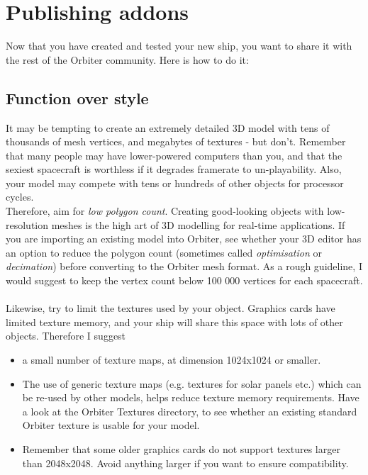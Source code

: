 \documentclass[Orbiter Developer Manual.tex]{subfiles}
\begin{document}
\section{Publishing addons}
Now that you have created and tested your new ship, you want to share it with the rest of the Orbiter community. Here is how to do it:

\subsection{Function over style}
It may be tempting to create an extremely detailed 3D model with tens of thousands of mesh vertices, and megabytes of textures - but don't. Remember that many people may have lower-powered computers than you, and that the sexiest spacecraft is worthless if it degrades framerate to un-playability. Also, your model may compete with tens or hundreds of other objects for processor cycles.\\
Therefore, aim for \textit{low polygon count}. Creating good-looking objects with low-resolution meshes is the high art of 3D modelling for real-time applications. If you are importing an existing model into Orbiter, see whether your 3D editor has an option to reduce the polygon count (sometimes called \textit{optimisation} or \textit{decimation}) before converting to the Orbiter mesh format. As a rough guideline, I would suggest to keep the vertex count below 100 000 vertices for each spacecraft.\\
\\
Likewise, try to limit the textures used by your object. Graphics cards have limited texture memory, and your ship will share this space with lots of other objects. Therefore I suggest

\begin{itemize}
\item a small number of texture maps, at dimension 1024x1024 or smaller.
\item The use of generic texture maps (e.g. textures for solar panels etc.) which can be re-used by other models, helps reduce texture memory requirements. Have a look at the Orbiter Textures directory, to see whether an existing standard Orbiter texture is usable for your model.
\item Remember that some older graphics cards do not support textures larger than 2048x2048. Avoid anything larger if you want to ensure compatibility.
\end{itemize}
\end{document}
